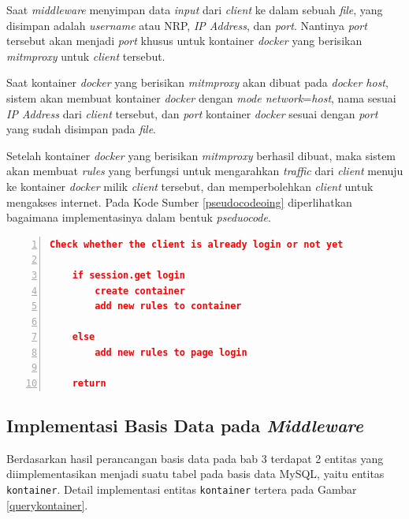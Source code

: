 Saat \textit{middleware} menyimpan data \textit{input} dari \textit{client} ke dalam sebuah \textit{file}, yang disimpan adalah \textit{username} atau NRP, \textit{IP Address}, dan \textit{port}. Nantinya \textit{port} tersebut akan menjadi \textit{port} khusus untuk kontainer \textit{docker} yang berisikan \textit{mitmproxy} untuk \textit{client} tersebut.

Saat kontainer \textit{docker} yang berisikan \textit{mitmproxy} akan dibuat pada \textit{docker host}, sistem akan membuat kontainer \textit{docker} dengan \textit{mode network}=\textit{host}, nama sesuai \textit{IP Address} dari \textit{client} tersebut, dan \textit{port} kontainer \textit{docker} sesuai dengan \textit{port} yang sudah disimpan pada \textit{file}.

Setelah kontainer \textit{docker} yang berisikan \textit{mitmproxy} berhasil dibuat, maka sistem akan membuat \textit{rules} yang berfungsi untuk mengarahkan \textit{traffic} dari \textit{client} menuju ke kontainer \textit{docker} milik \textit{client} tersebut, dan memperbolehkan \textit{client} untuk mengakses internet. Pada Kode Sumber \ref{pseudocodeoing} diperlihatkan bagaimana implementasinya dalam bentuk \textit{pseduocode}.
\newline

\begin{minipage}{\linewidth}  
	\begin{lstlisting}[numbers=left, frame=single,tabsize=2,breaklines,caption={Pseudocode Web Service},label=pseudocodeoing,language=json]
	Check whether the client is already login or not yet
	
	if session.get login
		create container
		add new rules to container
	
	else
		add new rules to page login
	
	return  	
	\end{lstlisting}
\end{minipage}

\subsection{Implementasi Basis Data pada \textit{Middleware}}
Berdasarkan hasil perancangan basis data pada bab 3 terdapat 2 entitas yang diimplementasikan menjadi suatu tabel pada basis data MySQL, yaitu entitas \texttt{kontainer}. Detail implementasi entitas \texttt{kontainer} tertera pada Gambar \ref{querykontainer}.


